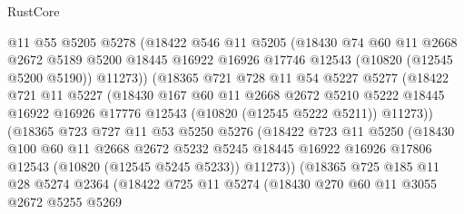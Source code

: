 \begin{lexlean}{RustCore}
\begin{coremodule}
                @11
                @55
                @5205
                @5278
                (@18422
                  @546
                  @11
                  @5205
                  (@18430
                    @74
                    @60
                    @11
                    @2668
                    @2672
                    @5189
                    @5200
                    @18445
                    @16922
                    @16926
                    @17746
                    @12543
                    (@10820 (@12545 @5200 @5190))
                    @11273))
                (@18365
                  @721
                  @728
                  @11
                  @54
                  @5227
                  @5277
                  (@18422
                    @721
                    @11
                    @5227
                    (@18430
                      @167
                      @60
                      @11
                      @2668
                      @2672
                      @5210
                      @5222
                      @18445
                      @16922
                      @16926
                      @17776
                      @12543
                      (@10820 (@12545 @5222 @5211))
                      @11273))
                  (@18365
                    @723
                    @727
                    @11
                    @53
                    @5250
                    @5276
                    (@18422
                      @723
                      @11
                      @5250
                      (@18430
                        @100
                        @60
                        @11
                        @2668
                        @2672
                        @5232
                        @5245
                        @18445
                        @16922
                        @16926
                        @17806
                        @12543
                        (@10820 (@12545 @5245 @5233))
                        @11273))
                    (@18365
                      @725
                      @185
                      @11
                      @28
                      @5274
                      @2364
                      (@18422
                        @725
                        @11
                        @5274
                        (@18430
                          @270
                          @60
                          @11
                          @3055
                          @2672
                          @5255
                          @5269

\end{coremodule}
\end{lexlean}
